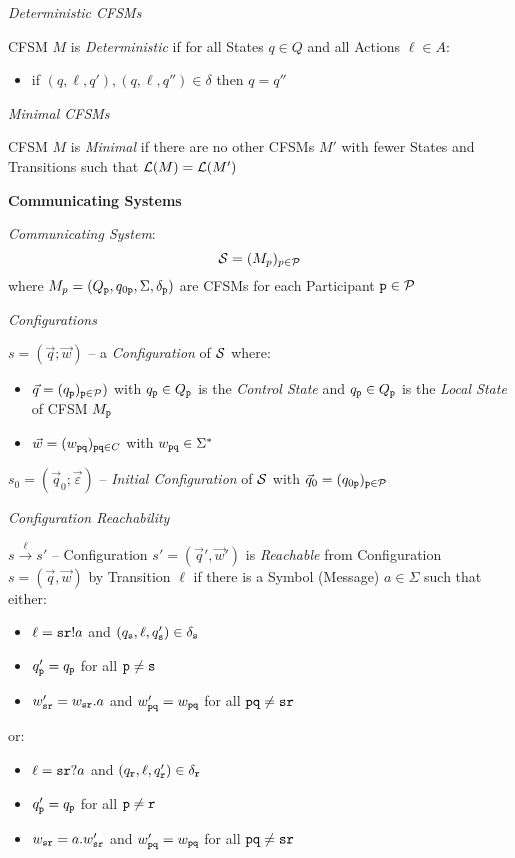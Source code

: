 \emph{Deterministic CFSMs}

CFSM $M$ is \emph{Deterministic} if for all States $q \in Q$ and all
Actions $\ell \in A$:
\begin{itemize}
  \item if $(q,\ell,q'),(q,\ell,q'') \in \delta$ then $q = q''$
\end{itemize}

\emph{Minimal CFSMs}

CFSM $M$ is \emph{Minimal} if there are no other CFSMs $M'$ with fewer
States and Transitions such that $\mathcal{L}(M) = \mathcal{L}(M')$


\textbf{Communicating Systems}

\emph{Communicating System}:
\[
  \mathcal{S} = (M_p)_{p \in \mathcal{P}}
\]
where $M_p = (Q_\mathtt{p}, q_{0\mathtt{p}}, \Sigma, \delta_\mathtt{p})$
are CFSMs for each Participant $\mathtt{p} \in \mathcal{P}$

\emph{Configurations}

$s = (\vec{q};\vec{w})$ -- a \emph{Configuration} of $\mathcal{S}$
where:
\begin{itemize}
  \item $\vec{q} = (q_\mathtt{p})_{\mathtt{p} \in \mathcal{P}})$ with
    $q_\mathtt{p} \in Q_\mathtt{p}$ is the \emph{Control State} and
    $q_\mathtt{p} \in Q_\mathtt{p}$ is the \emph{Local State} of CFSM
    $M_\mathtt{p}$
  \item $\vec{w} = (w_\mathtt{pq})_{\mathtt{pq} \in C}$ with
    $w_\mathtt{pq} \in \Sigma^*$
\end{itemize}
$s_0 = (\vec{q}_0;\vec{\varepsilon})$ -- \emph{Initial Configuration}
of $\mathcal{S}$ with $\vec{q}_0 = (q_{0\mathtt{p}})_{\mathtt{p} \in
  \mathcal{P}}$

\emph{Configuration Reachability}

$s \xrightarrow{\ell} s'$ -- Configuration $s' = (\vec{q}',\vec{w}')$
is \emph{Reachable} from Configuration $s = (\vec{q},\vec{w})$ by
Transition $\ell$ if there is a Symbol (Message) $a \in \Sigma$ such
that either:
\begin{itemize}
  \item $\ell = \mathtt{sr}!a$ and $(q_\mathtt{s},\ell,q_\mathtt{s}') \in
    \delta_\mathtt{s}$
  \item $q_\mathtt{p}' = q_\mathtt{p}$ for all $\mathtt{p \neq s}$
  \item $w_\mathtt{sr}' = w_\mathtt{sr}.a$ and $w_\mathtt{pq}' =
    w_\mathtt{pq}$ for all $\mathtt{pq \neq sr}$
\end{itemize}
or:
\begin{itemize}
  \item $\ell = \mathtt{sr}?a$ and $(q_\mathtt{r},\ell,q_\mathtt{r}') \in
    \delta_\mathtt{r}$
  \item $q_\mathtt{p}' = q_\mathtt{p}$ for all $\mathtt{p \neq r}$
  \item $w_\mathtt{sr} = a.w_\mathtt{sr}'$ and $w_\mathtt{pq}' =
    w_\mathtt{pq}$ for all $\mathtt{pq \neq sr}$
\end{itemize}

